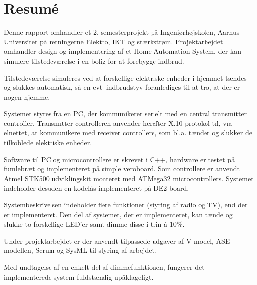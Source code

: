 \chapter{Resumé}
Denne rapport omhandler et 2. semesterprojekt på Ingeniørhøjskolen, Aarhus Universitet på retningerne Elektro, IKT og stærkstrøm. Projektarbejdet omhandler design og implementering af et Home Automation System, der kan simulere tilstedeværelse i en bolig for at forebygge indbrud. 

Tilstedeværelse simuleres ved at forskellige elektriske enheder i hjemmet tændes og slukkes automatisk, så en evt. indbrudstyv foranlediges til at tro, at der er nogen hjemme. 

Systemet styres fra en PC, der kommunikerer serielt med en central transmitter controller. Transmitter controlleren anvender herefter X.10 protokol til, via elnettet, at kommunikere med receiver controllere, som bl.a. tænder og slukker de tilkoblede elektriske enheder. 

Software til PC og microcontrollere er skrevet i C++, hardware er testet på fumlebræt og implementeret på simple veroboard. Som controllere er anvendt Atmel STK500 udviklingskit monteret med ATMega32 microcontrollers. Systemet indeholder desuden en kodelås implementeret på DE2-board.

Systembeskrivelsen indeholder flere funktioner (styring af radio og TV), end der er implementeret. Den del af systemet, der er implementeret, kan tænde og slukke to forskellige LED'er samt dimme disse i trin á $10\%$. 

Under projektarbejdet er der anvendt tilpassede udgaver af V-model, ASE-modellen, Scrum og SysML til styring af arbejdet. 

Med undtagelse af en enkelt del af dimmefunktionen, fungerer det implementerede system fuldstændig upåklageligt.